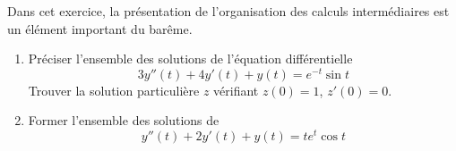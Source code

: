 Dans cet exercice, la présentation de l'organisation des calculs intermédiaires est un élément important du barême.
\begin{enumerate}
\item Préciser l'ensemble des solutions de l'équation différentielle
\begin{displaymath}
3y''(t)+4y'(t)+y(t)=e^{-t} \sin t 
\end{displaymath}
Trouver la solution particulière $z$  vérifiant $z(0)=1$, $z'(0)=0$.
\item Former l'ensemble des solutions de
\begin{displaymath}
y''(t)+2y'(t)+y(t)=te^{t}\cos t 
\end{displaymath}

\end{enumerate} 
